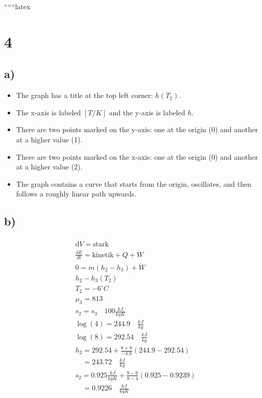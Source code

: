 
``````latex


\section*{4}
\subsection*{a)}
\begin{itemize}
    \item The graph has a title at the top left corner: \(h(T_2)\).
    \item The x-axis is labeled \([T/K]\) and the y-axis is labeled \(h\).
    \item There are two points marked on the y-axis: one at the origin (0) and another at a higher value (1).
    \item There are two points marked on the x-axis: one at the origin (0) and another at a higher value (2).
    \item The graph contains a curve that starts from the origin, oscillates, and then follows a roughly linear path upwards.
\end{itemize}

\subsection*{b)}
\begin{align*}
    &\text{d} \dot{V} = \text{stark} \\
    &\frac{dE}{dt} = \text{kinetik} + \dot{Q} + \dot{W} \\
    &0 = \dot{m}(h_2 - h_3) + \dot{W} \\
    &h_2 - h_3(T_2) \\
    &T_2 = -6^\circ C \\
    &\mu_3 = 813 \\
    &s_2 = s_3 \quad 100 \frac{kJ}{kgK} \\
    &\log(4) = 244.9 \quad \frac{kJ}{kg} \\
    &\log(8) = 292.54 \quad \frac{kJ}{kg} \\
    &h_2 = 292.54 + \frac{8 + 8}{-4.8} (244.9 - 292.54) \\
    &\quad = 243.72 \quad \frac{kJ}{kg} \\
    &s_2 = 0.925 \frac{kJ}{kgK} + \frac{8 - 6}{8 - 4} (0.925 - 0.9239) \\
    &\quad = 0.9226 \quad \frac{kJ}{kgK}
\end{align*}

